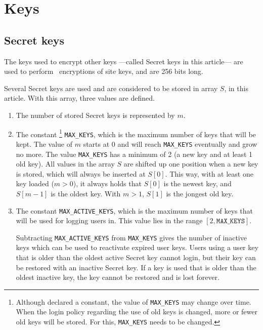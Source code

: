 %
%
%
\section{Keys}

\subsection{Secret keys}
\label{sec:secret_keys}
The keys used to encrypt other keys%
---called Secret keys in this article---%
are used to perform \AES\ encryptions of site keys,
and are 256 bits long.
\par
Several Secret keys are used and
are considered to be stored in array $S$, in this article.
With this array, three values are defined.
\begin{enumerate}
\item	The number of stored Secret keys is represented by $m$.
\item	The constant%
\footnote{Although declared a constant, the value of \texttt{MAX\_KEYS} may change over time.
When the login policy regarding the use of old keys is changed, more or fewer old keys will be stored.
For this, \texttt{MAX\_KEYS} needs to be changed.}
\texttt{MAX\_KEYS}, which is the maximum number of keys that will be kept.
The value of $m$ starts at 0 and will reach \texttt{MAX\_KEYS} eventually and grow no more.
The value \texttt{MAX\_KEYS} has a minimum of 2 (a new key and at least 1 old key).
All values in the array $S$ are shifted up one position when a new key is stored, which will always be inserted at $S[0]$.
This way, with at least one key loaded ($m>0$), it always holds that $S[0]$ is the newest key,
and $S[m-1]$ is the oldest key.
With $m>1$, $S[1]$ is the jongest old key.
\item	The constant \texttt{MAX\_ACTIVE\_KEYS},
which is the maximum number of keys that will be used for logging users in.
This value lies in the range $[2, \mathtt{MAX\_KEYS}]$.
\par
Subtracting \texttt{MAX\_ACTIVE\_KEYS} from \texttt{MAX\_KEYS}
gives the number of inactive keys which can be used to reactivate expired user keys.
Users using a user key that is older than the oldest active Secret key cannot login,
but their key can be restored with an inactive Secret key.
If a key is used that is older than the oldest inactive key,
the key cannot be restored and is lost forever.
\end{enumerate}

